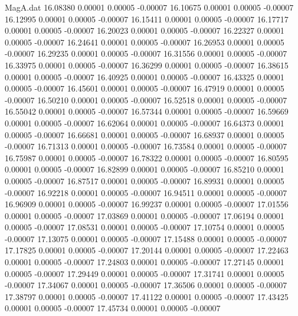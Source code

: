 \begin{filecontents}{MagA.dat}
  16.08380    0.00001    0.00005   -0.00007
  16.10675    0.00001    0.00005   -0.00007
  16.12995    0.00001    0.00005   -0.00007
  16.15411    0.00001    0.00005   -0.00007
  16.17717    0.00001    0.00005   -0.00007
  16.20023    0.00001    0.00005   -0.00007
  16.22327    0.00001    0.00005   -0.00007
  16.24641    0.00001    0.00005   -0.00007
  16.26953    0.00001    0.00005   -0.00007
  16.29235    0.00001    0.00005   -0.00007
  16.31556    0.00001    0.00005   -0.00007
  16.33975    0.00001    0.00005   -0.00007
  16.36299    0.00001    0.00005   -0.00007
  16.38615    0.00001    0.00005   -0.00007
  16.40925    0.00001    0.00005   -0.00007
  16.43325    0.00001    0.00005   -0.00007
  16.45601    0.00001    0.00005   -0.00007
  16.47919    0.00001    0.00005   -0.00007
  16.50210    0.00001    0.00005   -0.00007
  16.52518    0.00001    0.00005   -0.00007
  16.55042    0.00001    0.00005   -0.00007
  16.57344    0.00001    0.00005   -0.00007
  16.59669    0.00001    0.00005   -0.00007
  16.62064    0.00001    0.00005   -0.00007
  16.64373    0.00001    0.00005   -0.00007
  16.66681    0.00001    0.00005   -0.00007
  16.68937    0.00001    0.00005   -0.00007
  16.71313    0.00001    0.00005   -0.00007
  16.73584    0.00001    0.00005   -0.00007
  16.75987    0.00001    0.00005   -0.00007
  16.78322    0.00001    0.00005   -0.00007
  16.80595    0.00001    0.00005   -0.00007
  16.82899    0.00001    0.00005   -0.00007
  16.85210    0.00001    0.00005   -0.00007
  16.87517    0.00001    0.00005   -0.00007
  16.89931    0.00001    0.00005   -0.00007
  16.92218    0.00001    0.00005   -0.00007
  16.94511    0.00001    0.00005   -0.00007
  16.96909    0.00001    0.00005   -0.00007
  16.99237    0.00001    0.00005   -0.00007
  17.01556    0.00001    0.00005   -0.00007
  17.03869    0.00001    0.00005   -0.00007
  17.06194    0.00001    0.00005   -0.00007
  17.08531    0.00001    0.00005   -0.00007
  17.10754    0.00001    0.00005   -0.00007
  17.13075    0.00001    0.00005   -0.00007
  17.15488    0.00001    0.00005   -0.00007
  17.17825    0.00001    0.00005   -0.00007
  17.20144    0.00001    0.00005   -0.00007
  17.22463    0.00001    0.00005   -0.00007
  17.24803    0.00001    0.00005   -0.00007
  17.27145    0.00001    0.00005   -0.00007
  17.29449    0.00001    0.00005   -0.00007
  17.31741    0.00001    0.00005   -0.00007
  17.34067    0.00001    0.00005   -0.00007
  17.36506    0.00001    0.00005   -0.00007
  17.38797    0.00001    0.00005   -0.00007
  17.41122    0.00001    0.00005   -0.00007
  17.43425    0.00001    0.00005   -0.00007
  17.45734    0.00001    0.00005   -0.00007

\end{filecontents}
